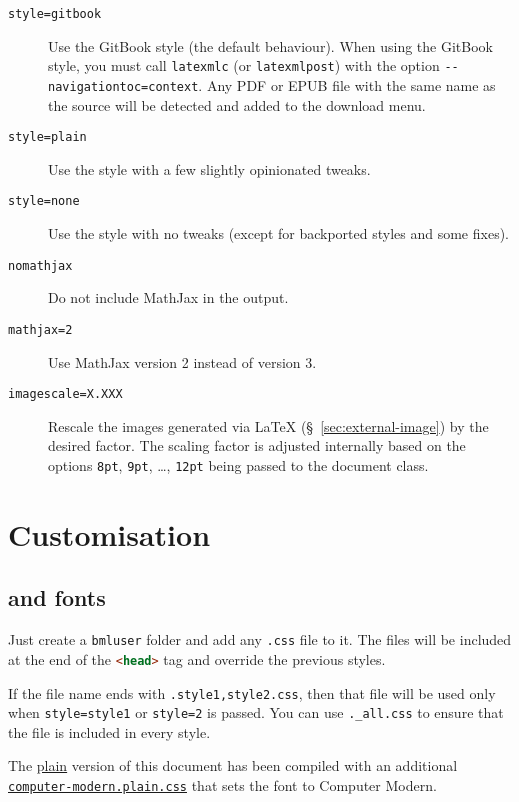 \documentclass[a4paper,british]{article}
\def\ltxinline{\lstinline[style=bookml]}
\def\htmlinline{\lstinline[language=html]}
\begin{document}
\begin{description}
  \item[\texttt{style=gitbook}] Use the GitBook style (the default behaviour). When using the GitBook style, you must call \ltxinline|latexmlc| (or \ltxinline|latexmlpost|) with the option \ltxinline|--navigationtoc=context|. Any PDF or EPUB file with the same name as the source will be detected and added to the download menu.
  \item[\texttt{style=plain}] Use the \LaTeXML{} style with a few slightly opinionated tweaks.
  \item[\texttt{style=none}] Use the \LaTeXML{} style with no tweaks (except for backported styles and some fixes).
  \item[\texttt{nomathjax}] Do not include MathJax in the output.
  \item[\texttt{mathjax=2}] Use MathJax version 2 instead of version 3.
  \item[\texttt{imagescale=X.XXX}] Rescale the images generated via \LaTeX{} (\S~\ref{sec:external-image}) by the desired factor. The scaling factor is adjusted internally based on the options \ltxinline|8pt|, \ltxinline|9pt|, \dots, \ltxinline|12pt| being passed to the document class.
\end{description}

\section{Customisation}

\subsection{\CSS{} and fonts}
Just create a \lstinline|bmluser| folder and add any \lstinline|.css| file to it. The files will be included at the end of the \htmlinline|<head>| tag and override the previous styles.

If the file name ends with \lstinline|.style1,style2.css|, then that file will be used only when \lstinline|style=style1| or \lstinline|style=2| is passed. You can use \lstinline|._all.css| to ensure that the file is included in every style.

The \href{https://vlmantova.github.io/bookml/index.plain.html}{plain} version of this document has been compiled with an additional \href{https://vlmantova.github.io/bookml/bmluser/computer-modern.plain.css}{\texttt{computer-modern.plain.css}} that sets the font to Computer Modern.
\end{document}
